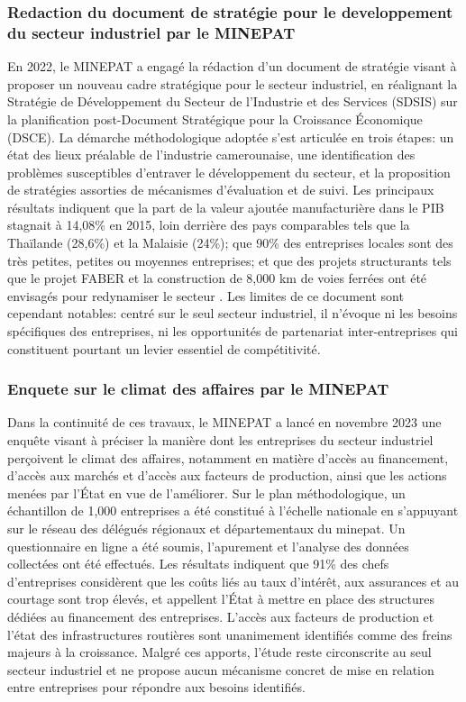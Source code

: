 \documentclass[12pt, a4paper, oneside]{report}
\begin{document}
	\subsubsection{Redaction du document de stratégie pour le developpement du secteur industriel par le MINEPAT}
	En 2022, le MINEPAT a engagé la rédaction d'un document de stratégie visant à proposer un nouveau cadre stratégique pour le secteur industriel, en réalignant la Stratégie de Développement du Secteur de l'Industrie et des Services (SDSIS) sur la planification post-Document Stratégique pour la Croissance Économique (DSCE). La démarche méthodologique adoptée s'est articulée en trois étapes: un état des lieux préalable de l'industrie camerounaise, une identification des problèmes susceptibles d'entraver le développement du secteur, et la proposition de stratégies assorties de mécanismes d'évaluation et de suivi. Les principaux résultats indiquent que la part de la valeur ajoutée manufacturière dans le PIB stagnait à 14,08\% en 2015, loin derrière des pays comparables tels que la Thaïlande (28,6\%) et la Malaisie (24\%); que 90\% des entreprises locales sont des très petites, petites ou moyennes entreprises; et que des projets structurants tels que le projet FABER et la construction de 8,000 km de voies ferrées ont été envisagés pour redynamiser le secteur \cite{minepat2022}. Les limites de ce document sont cependant notables: centré sur le seul secteur industriel, il n'évoque ni les besoins spécifiques des entreprises, ni les opportunités de partenariat inter-entreprises qui constituent pourtant un levier essentiel de compétitivité. \\
	
\subsubsection{Enquete sur le climat des affaires par le MINEPAT}
	Dans la continuité de ces travaux, le MINEPAT a lancé en novembre 2023 une enquête visant à préciser la manière dont les entreprises du secteur industriel perçoivent le climat des affaires, notamment en matière d'accès au financement, d'accès aux marchés et d'accès aux facteurs de production, ainsi que les actions menées par l'État en vue de l'améliorer. Sur le plan méthodologique, un échantillon de 1,000 entreprises a été constitué à l'échelle nationale en s'appuyant sur le réseau des délégués régionaux et départementaux du \gls{minepat}. Un questionnaire en ligne a été soumis, l'apurement et l'analyse des données collectées ont été effectués. Les résultats indiquent que 91\% des chefs d'entreprises considèrent que les coûts liés au taux d'intérêt, aux assurances et au courtage sont trop élevés, et appellent l'État à mettre en place des structures dédiées au financement des entreprises. L'accès aux facteurs de production et l'état des infrastructures routières sont unanimement identifiés comme des freins majeurs à la croissance. Malgré ces apports, l'étude reste circonscrite au seul secteur industriel et ne propose aucun mécanisme concret de mise en relation entre entreprises pour répondre aux besoins identifiés. \\
	
\end{document}
